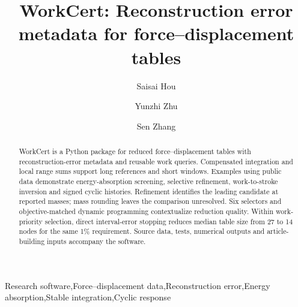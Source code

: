 \documentclass[preprint,12pt,a4paper]{elsarticle}
\begin{document}
\begin{frontmatter}
\title{WorkCert: Reconstruction error metadata for force--displacement tables}
\author[a]{Saisai Hou}\author[a]{Yunzhi Zhu}\author[a]{Sen Zhang}
\begin{abstract}
WorkCert is a Python package for reduced force--displacement tables with reconstruction-error metadata and reusable work queries. Compensated integration and local range sums support long references and short windows. Examples using public data demonstrate energy-absorption screening, selective refinement, work-to-stroke inversion and signed cyclic histories. Refinement identifies the leading candidate at reported masses; mass rounding leaves the comparison unresolved. Six selectors and objective-matched dynamic programming contextualize reduction quality. Within work-priority selection, direct interval-error stopping reduces median table size from 27 to 14 nodes for the same 1\% requirement. Source data, tests, numerical outputs and article-building inputs accompany the software.
\end{abstract}
\begin{keyword}Research software\sep Force--displacement data\sep Reconstruction error\sep Energy absorption\sep Stable integration\sep Cyclic response\end{keyword}
\end{frontmatter}\clearpage
\end{document}
